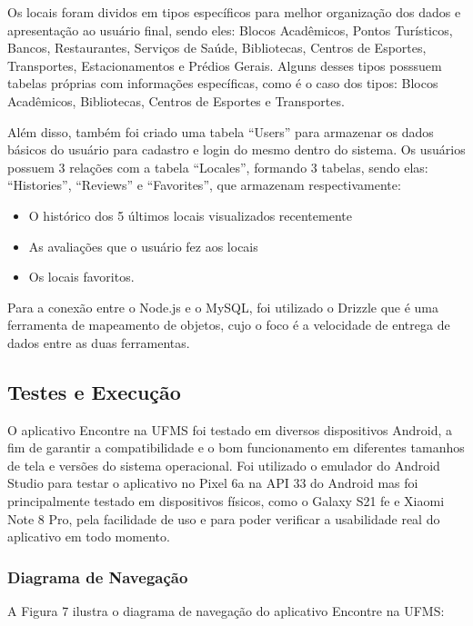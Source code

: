     Os locais foram dividos em tipos específicos para melhor organização dos dados e apresentação ao usuário final, sendo eles: Blocos Acadêmicos, Pontos Turísticos, Bancos, Restaurantes, Serviços de Saúde, Bibliotecas, Centros de Esportes, Transportes, Estacionamentos e Prédios Gerais. Alguns desses tipos posssuem tabelas próprias com informações específicas, como é o caso dos tipos: Blocos Acadêmicos, Bibliotecas, Centros de Esportes e Transportes. 
    
    Além disso, também foi criado uma tabela ``Users'' para armazenar os dados básicos do usuário para cadastro e login do mesmo dentro do sistema. Os usuários possuem 3 relações com a tabela ``Locales'', formando 3 tabelas, sendo elas: ``Histories'', ``Reviews'' e ``Favorites'', que armazenam respectivamente:
    
    \begin{itemize}
        \item O histórico dos 5 últimos locais visualizados recentemente
        \item As avaliações que o usuário fez aos locais 
        \item Os locais favoritos.
    \end{itemize}

    Para a conexão entre o Node.js e o MySQL, foi utilizado o Drizzle que é uma ferramenta de mapeamento de objetos, cujo o foco é a velocidade de entrega de dados entre as duas ferramentas. 

\subsection{Testes e Execução}

    O aplicativo Encontre na UFMS foi testado em diversos dispositivos Android, a fim de garantir a compatibilidade e o bom funcionamento em diferentes tamanhos de tela e versões do sistema operacional. Foi utilizado o emulador do Android Studio para testar o aplicativo no Pixel 6a na API 33 do Android mas foi principalmente testado em dispositivos físicos, como o Galaxy S21 fe e Xiaomi Note 8 Pro, pela facilidade de uso e para poder verificar a usabilidade real do aplicativo em todo momento.

\subsubsection{Diagrama de Navegação}

    A Figura 7 ilustra o diagrama de navegação do aplicativo Encontre na UFMS:

